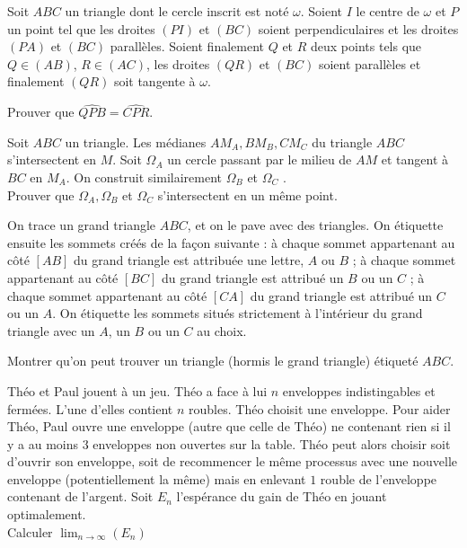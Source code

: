 \begin{exo}{}
Soit $ABC$ un triangle dont le cercle inscrit est noté $ \omega$. Soient $I$ le centre de $ \omega$ et $P$ un point tel que les droites $(PI)$ et $(BC)$ soient perpendiculaires et les droites $(PA)$ et $(BC)$ parallèles. Soient finalement $Q$ et $R$ deux points tels que $Q \in (AB)$, $R \in (AC)$, les droites $(QR)$ et $(BC)$ soient parallèles et finalement $(QR)$ soit tangente à $ \omega$.

Prouver que $ \widehat {QPB}= \widehat {CPR}$.
\end{exo}

\begin{exo}{}
Soit $ABC$ un triangle. Les médianes $AM_A,BM_B,CM_C$ du triangle $ABC$ s'intersectent en $M$. Soit $\Omega_A$ un cercle passant par le milieu de $AM$ et tangent à $BC$ en $M_A$. On construit similairement $\Omega_B$ et $\Omega_C$ . \\Prouver que $\Omega_A,\Omega_B$ et $\Omega_C$ s'intersectent en un même point.

\end{exo}


\begin{exo}{}
On trace un grand triangle $ABC$, et on le pave avec des triangles. On
étiquette ensuite les sommets créés de la façon suivante : à chaque
sommet appartenant au côté $[AB]$ du grand triangle est attribuée
une lettre, $A$ ou $B$ ; à chaque sommet appartenant au côté $[BC]$
du grand triangle est attribué un $B$ ou un $C$ ; à chaque sommet
appartenant au côté $[CA]$ du grand triangle est attribué un $C$ ou un $A$.
On étiquette les sommets situés strictement à l'intérieur du grand triangle
avec un $A$, un $B$ ou un $C$ au choix.

Montrer qu'on peut trouver un triangle (hormis le grand triangle) étiqueté $ABC$.
 \end{exo}


\begin{exo}{}
Théo et Paul jouent à un jeu. Théo a face à lui $n$ enveloppes indistingables et fermées. L'une d'elles contient $n$ roubles. Théo choisit une enveloppe. Pour aider Théo, Paul ouvre une enveloppe (autre que celle de Théo) ne contenant rien si il y a au moins $3$ enveloppes non ouvertes sur la table. Théo peut alors choisir soit d'ouvrir son enveloppe, soit de recommencer le même processus avec une nouvelle enveloppe (potentiellement la même) mais en enlevant $1$ rouble de l'enveloppe contenant de l'argent. Soit $E_n$ l'espérance du gain de Théo en jouant optimalement. \\
Calculer $\lim_{n\to \infty}(E_n)$
\end{exo}

